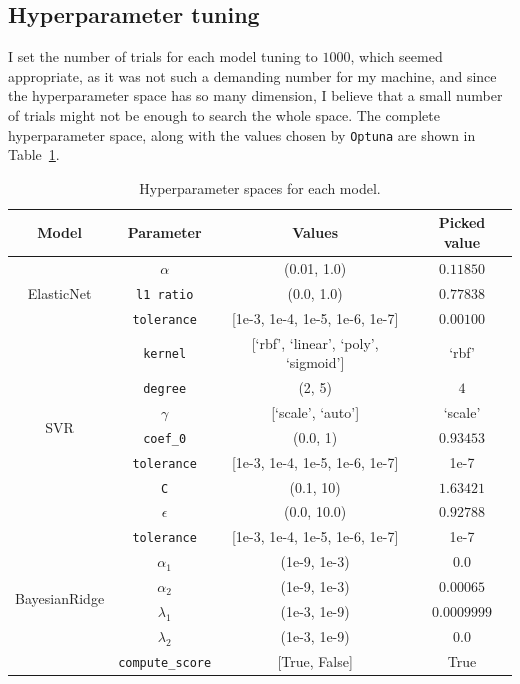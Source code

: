 \documentclass[12pt]{article}
\begin{document}
\subsection{Hyperparameter tuning}
I set the number of trials for each model tuning to $1000$, which seemed appropriate,
as it was not such a demanding number for my machine, and since the hyperparameter
space has so many dimension, I believe that a small number of trials might not be
enough to search the whole space. The complete hyperparameter space, along with the
values chosen by \texttt{Optuna} are shown in Table~\ref{tab:hyperparams}.

\begin{table}[H]
    \centering
    \begin{tabular}{|c|c|c|c|}
        \hline
        \textbf{Model} & \textbf{Parameter} & \textbf{Values} & \textbf{Picked value} \\
        \hline
        \multirow{3}{*}{ElasticNet} 
            & \texttt{$\alpha$} & (0.01, 1.0) & $0.11850$ \\
            & \texttt{l1 ratio} & (0.0, 1.0) & $0.77838$ \\
            & \texttt{tolerance} & [1e-3, 1e-4, 1e-5, 1e-6, 1e-7] & $0.00100$ \\
        \hline
        \multirow{7}{*}{SVR} 
            & \texttt{kernel} & [`rbf', `linear', `poly', `sigmoid'] & `rbf' \\
            & \texttt{degree} & (2, 5) & $4$ \\
            & \texttt{$\gamma$} & [`scale', `auto'] & `scale' \\
            & \texttt{coef\_0} & (0.0, 1) & $0.93453$ \\
            & \texttt{tolerance} & [1e-3, 1e-4, 1e-5, 1e-6, 1e-7] & 1e-7 \\
            & \texttt{C} & (0.1, 10) & $1.63421$ \\
            & \texttt{$\epsilon$} & (0.0, 10.0) & $0.92788$ \\
        \hline
        \multirow{6}{*}{BayesianRidge} 
            & \texttt{tolerance} & [1e-3, 1e-4, 1e-5, 1e-6, 1e-7] & 1e-7 \\
            & \texttt{$\alpha_1$} & (1e-9, 1e-3) & $0.0$ \\
            & \texttt{$\alpha_2$} & (1e-9, 1e-3) & $0.00065$ \\
            & \texttt{$\lambda_1$} & (1e-3, 1e-9) & $0.0009999$ \\
            & \texttt{$\lambda_2$} & (1e-3, 1e-9) & $0.0$ \\
            & \texttt{compute\_score} & [True, False] & True \\
        \hline
    \end{tabular}
    \caption{Hyperparameter spaces for each model.}
    \label{tab:hyperparams}
\end{table}
\end{document}
